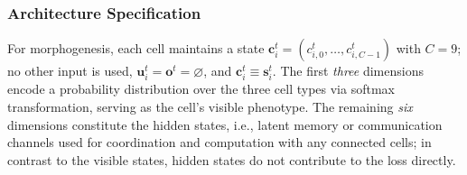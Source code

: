 \documentclass[letterpaper]{article}
\newcommand{\bh}[1]{{\color{black}#1}}  %
\begin{document}
\subsubsection{Architecture Specification}

For morphogenesis, each cell maintains a 
state \bh{$\mathbf{c}_i^t=(c_{i,0}^t, \dotsc, c_{i,C-1}^t)$ with $C=9$; no other input is used, $\mathbf{u}^t_i=\mathbf{o}^t=\varnothing$, and $\mathbf{c}_i^t\equiv\mathbf{s}_i^t$}. The first \textit{three} dimensions encode a probability distribution over the three cell types via softmax transformation, serving as the cell's visible  phenotype. The remaining 
\bh{\textit{six}}
dimensions constitute the hidden states\bh{, i.e.,} %
latent memory or communication channels used for coordination and computation with 
\bh{any}
connected cells\bh{; in contrast to the visible states, hidden states do not contribute to the loss directly.} 
\end{document}
